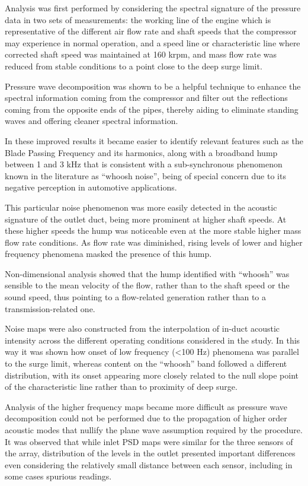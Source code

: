 Analysis was first performed by considering the spectral signature of the pressure data in two sets of measurements: the working line of the engine which is representative of the different air flow rate and shaft speeds that the compressor may experience in normal operation, and a speed line or characteristic line where corrected shaft speed was maintained at 160 krpm, and mass flow rate was reduced from stable conditions to a point close to the deep surge limit.

Pressure wave decomposition was shown to be a helpful technique to enhance the spectral information coming from the compressor and filter out the reflections coming from the opposite ends of the pipes, thereby aiding to eliminate standing waves and offering  cleaner spectral information.

In these improved results it became easier to identify relevant features such as the Blade Passing Frequency and its harmonics, along with a broadband hump between 1 and 3 kHz that is consistent with a sub-synchronous phenomenon known in the literature as ``whoosh noise'', being of special concern due to its negative perception in automotive applications.

This particular noise phenomenon was more easily detected in the acoustic signature of the outlet duct, being more prominent at higher shaft speeds. At these higher speeds the hump was noticeable even at the more stable higher mass flow rate conditions. As flow rate was diminished, rising levels of lower and higher frequency phenomena masked the presence of this hump. 

Non-dimensional analysis showed that the hump identified with ``whoosh'' was sensible to the mean velocity of the flow, rather than to the shaft speed or the sound speed, thus pointing to a flow-related generation rather than to a transmission-related one.

Noise maps were also constructed from the interpolation of in-duct acoustic intensity across the different operating conditions considered in the study. In this way it was shown how onset of low frequency (<100 Hz) phenomena was parallel to the surge limit, whereas content on the ``whoosh'' band followed a different distribution, with its onset appearing more closely related to the null slope point of the characteristic line rather than to proximity of deep surge.

Analysis of the higher frequency maps became more difficult as pressure wave decomposition could not be performed due to the propagation of higher order acoustic modes that nullify the plane wave assumption required by the procedure. It was observed that while inlet PSD maps were similar for the three sensors of the array, distribution of the levels in the outlet presented important differences even considering the relatively small distance between each sensor, including in some cases spurious readings. 

